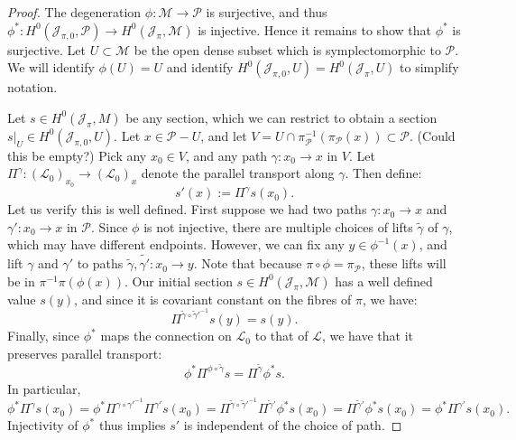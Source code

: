 \documentclass[]{article}
\newcommand{\Ap}{x}
\newcommand{\JJ}{\mathcal{J}}
\newcommand{\LL}{\mathcal{L}}
\newcommand{\MM}{\mathcal{M}}
\newcommand{\cP}{\mathcal{P}}
\begin{document}
	\begin{proof}
		The degeneration $\phi:\MM\to\cP$ is surjective, and thus $\phi^\ast:H^0(\JJ_{\pi,0},\cP) \to H^0(\JJ_\pi,\MM)$ is injective. Hence it remains to show that $\phi^\ast$ is surjective. Let $U \subset \MM$ be the open dense subset which is symplectomorphic to $\cP$. We will identify $\phi(U)=U$ and identify $H^0(\JJ_{\pi,0}, U) = H^0(\JJ_\pi, U)$ to simplify notation.
		\smallskip
		
		Let $s\in H^0(\JJ_\pi, M)$ be any section, which we can restrict to obtain a section $s|_U\in H^0(\JJ_{\pi,0}, U)$. Let $\Ap \in \cP - U$, and let $V = U\cap \pi_{\cP}^{-1}(\pi_{\cP}(\Ap)) \subset \cP$. (Could this be empty?) Pick any $x_0\in V$, and any path $\gamma:x_0\to\Ap$ in $V$. Let $\Pi^\gamma:(\LL_0)_{x_0}\to(\LL_0)_{\Ap}$ denote the parallel transport along $\gamma$. Then define:
		\begin{equation}
			s'(\Ap):= \Pi^\gamma s(x_0).
		\end{equation}
		Let us verify this is well defined. First suppose we had two paths $\gamma:x_0\to \Ap$ and $\gamma':x_0\to \Ap$ in $\cP$. Since $\phi$ is not injective, there are multiple choices of lifts $\tilde{\gamma}$ of $\gamma$, which may have different endpoints. However, we can fix any $y \in \phi^{-1}(\Ap)$, and lift $\gamma$ and $\gamma'$ to paths $\tilde{\gamma},\tilde{\gamma'}:x_0\to y$. Note that because $\pi \circ \phi = \pi_{\cP}$, these lifts will be in $\pi^{-1}\pi(\phi(\Ap))$. Our initial section $s\in H^0(\JJ_\pi, \MM)$ has a well defined value $s(y)$, and since it is covariant constant on the fibres of $\pi$, we have:
		\begin{equation}
		\Pi^{\tilde{\gamma}\circ \tilde{\gamma}'^{-1}} s(y) = s(y). 
		\end{equation}
		Finally, since $\phi^\ast$ maps the connection on $\LL_0$ to that of $\LL$, we have that it preserves parallel transport:
		\begin{equation}
		\phi^\ast \Pi^{\phi\circ\tilde{\gamma}} s = \Pi^{\tilde{\gamma}} \phi^\ast s.
		\end{equation}
		In particular, 
		\begin{equation}
		\phi^\ast \Pi^{\gamma}s(x_0) = \phi^\ast\Pi^{\gamma\circ\gamma'^{-1}}\Pi^{\gamma'}s(x_0) = \Pi^{\tilde{\gamma}\circ \tilde{\gamma}'^{-1}} \Pi^{\tilde{\gamma}'}\phi^\ast s(x_0) =  \Pi^{\tilde{\gamma}'}\phi^\ast s(x_0) = \phi^\ast\Pi^{\gamma'}s(x_0).
		\end{equation}
		Injectivity of $\phi^\ast$ thus implies $s'$ is independent of the choice of path. 
		\smallskip
		

\end{proof}
\end{document}
